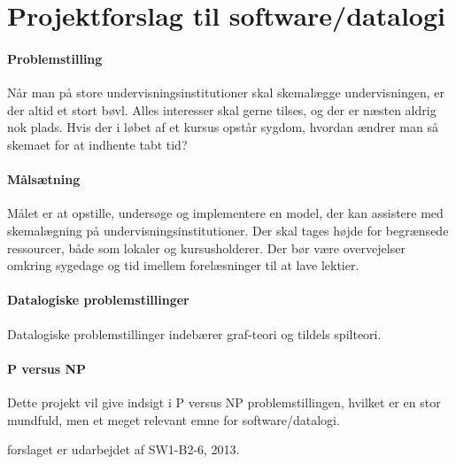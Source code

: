 


\section{Projektforslag til software/datalogi}

\paragraph{Problemstilling}

Når man på store undervisningsinstitutioner skal skemalægge undervisningen, er der altid et stort bøvl. Alles interesser skal gerne tilses, og der er næsten aldrig nok plads. Hvis der i løbet af et kursus opstår sygdom, hvordan ændrer man så skemaet for at indhente tabt tid?

\paragraph{Målsætning}

Målet er at opstille, undersøge og implementere en model, der kan assistere med skemalægning på undervisningsinstitutioner. Der skal tages højde for begrænsede ressourcer, både som lokaler og kursusholderer. Der bør være overvejelser omkring sygedage og tid imellem forelæsninger til at lave lektier.

\paragraph{Datalogiske problemstillinger}

Datalogiske problemstillinger indebærer graf-teori og tildels spilteori.

\paragraph{P versus NP}

Dette projekt vil give indsigt i P versus NP problemstillingen, hvilket er en stor mundfuld, men et meget relevant emne for software/datalogi. 

forslaget er udarbejdet af SW1-B2-6, 2013.
